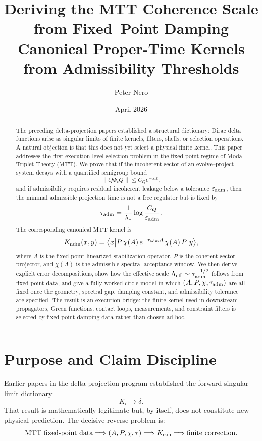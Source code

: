 \documentclass[11pt]{article}
\title{Deriving the MTT Coherence Scale from Fixed--Point Damping\\
\large Canonical Proper-Time Kernels from Admissibility Thresholds}
\author{Peter Nero}
\date{April 2026}
\begin{document}
\maketitle

\begin{abstract}
The preceding delta-projection papers established a structural dictionary: Dirac delta functions arise as singular limits of finite kernels, filters, shells, or selection operations. A natural objection is that this does not yet select a physical finite kernel. This paper addresses the first execution-level selection problem in the fixed-point regime of Modal Triplet Theory (MTT). We prove that if the incoherent sector of an evolve--project system decays with a quantified semigroup bound
\[
\|Q\Phi_t Q\| \le C_Q e^{-\lambda_\ast t},
\]
and if admissibility requires residual incoherent leakage below a tolerance \(\varepsilon_{\rm adm}\), then the minimal admissible projection time is not a free regulator but is fixed by
\[
\tau_{\rm adm}=\frac{1}{\lambda_\ast}\log\frac{C_Q}{\varepsilon_{\rm adm}} .
\]
The corresponding canonical MTT kernel is
\[
K_{\rm adm}(x,y)
=
\big\langle x\big|P\,\chi(A)\,e^{-\tau_{\rm adm}A}\,\chi(A)\,P\big|y\big\rangle,
\]
where \(A\) is the fixed-point linearized stabilization operator, \(P\) is the coherent-sector projector, and \(\chi(A)\) is the admissible spectral acceptance window. We then derive explicit error decompositions, show how the effective scale \(\Lambda_{\rm eff}\sim \tau_{\rm adm}^{-1/2}\) follows from fixed-point data, and give a fully worked circle model in which \((A,P,\chi,\tau_{\rm adm})\) are all fixed once the geometry, spectral gap, damping constant, and admissibility tolerance are specified. The result is an execution bridge: the finite kernel used in downstream propagators, Green functions, contact loops, measurements, and constraint filters is selected by fixed-point damping data rather than chosen ad hoc.
\end{abstract}

\section{Purpose and Claim Discipline}

Earlier papers in the delta-projection program established the forward singular-limit dictionary
\[
K_\epsilon \longrightarrow \delta .
\]
That result is mathematically legitimate but, by itself, does not constitute new physical prediction. The decisive reverse problem is:
\[
\text{MTT fixed-point data}
\Longrightarrow
(A,P,\chi,\tau)
\Longrightarrow
K_{\rm coh}
\Longrightarrow
\text{finite correction}.
\]
\end{document}
